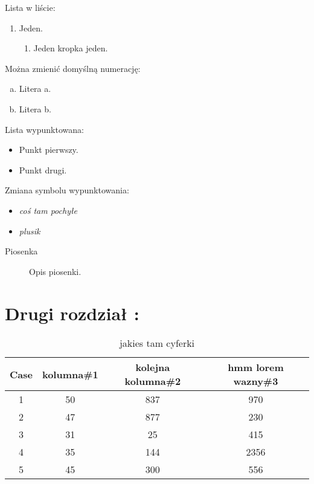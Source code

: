 \documentclass[12pt,a4paper]{article}
\begin{document}
Lista w liście: 

\begin{enumerate}
    \item Jeden.
    \begin{enumerate}
        \item Jeden kropka jeden.
    \end{enumerate}
\end{enumerate}

Można zmienić domyślną numerację: 
\begin{enumerate}[a)]
    \item Litera a.
    \item Litera b.
\end{enumerate}

Lista wypunktowana: 
\begin{itemize}
    \item Punkt pierwszy.
    \item Punkt drugi.
\end{itemize}

Zmiana symbolu wypunktowania: 
\begin{itemize}
    \item\textsl{coś tam pochyłe}
    \item\textit{plusik}
\end{itemize}

\begin{description}
    \item[Piosenka] Opis piosenki.
\end{description}

\section{Drugi rozdział :}
\begin{table}[ht]
\caption{jakies tam cyferki} %
\centering %
\begin{tabular}{c c c c} %
\hline\hline %
Case & kolumna\#1 & kolejna kolumna\#2 & hmm lorem wazny\#3 \\ [0.5ex] %
\hline %
1 & 50 & 837 & 970 \\ %
2 & 47 & 877 & 230 \\
3 & 31 & 25 & 415 \\
4 & 35 & 144 & 2356 \\
5 & 45 & 300 & 556 \\ [1ex] %
\hline %
\end{tabular}
\label{table:nonlin} %
\end{table}
\end{document}
